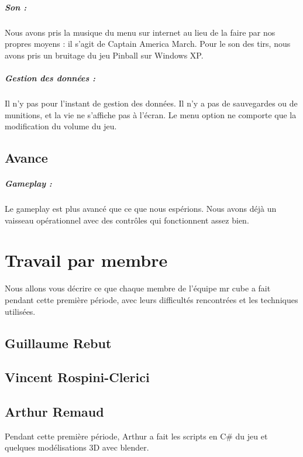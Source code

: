 \documentclass[10pt, titlepage]{report}
\begin{document}
\paragraph{Son :}
Nous avons pris la musique du menu sur internet au lieu de la faire par nos propres moyens : il s'agit de Captain America March. Pour le son des tirs, nous avons pris un bruitage du jeu Pinball sur Windows XP.

\paragraph{Gestion des données :}
Il n'y pas pour l'instant de gestion des données. Il n'y a pas de sauvegardes ou de munitions, et la vie ne s'affiche pas à l'écran. Le menu option ne comporte que la modification du volume du jeu.

\section{Avance}

\paragraph{Gameplay :}
Le gameplay est plus avancé que ce que nous espérions. Nous avons déjà un vaisseau opérationnel avec des contrôles qui fonctionnent assez bien.

\chapter{Travail par membre}
Nous allons vous décrire ce que chaque membre de l'équipe mr cube a fait pendant cette première période, avec leurs difficultés rencontrées et les techniques utilisées.

\section{Guillaume Rebut}

\section{Vincent Rospini-Clerici}

\section{Arthur Remaud}
Pendant cette première période, Arthur a fait les scripts en C\# du jeu et quelques modélisations 3D avec blender.
\end{document}
